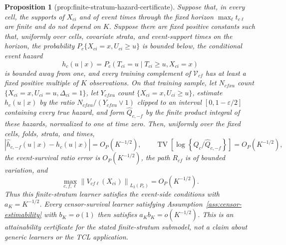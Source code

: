 \documentclass{article}
\newtheorem{proposition}{Proposition}
\begin{document}
\begin{proposition}[prop:finite-stratum-hazard-certificate]\label{prop:finite-stratum-hazard-certificate}
Suppose that, in every cell, the supports of \(X_{ci}\) and of event times through the fixed horizon \(\max_\ell t_{c\ell}\) are finite and do not depend on \(K\). Suppose there are fixed positive constants such that, uniformly over cells, covariate strata, and event-support times on the horizon, the probability \(P_c\{X_{ci}=x,U_{ci}\ge u\}\) is bounded below, the conditional event hazard
\[
 h_c(u\mid x)=P_c(T_{ci}=u\mid T_{ci}\ge u,X_{ci}=x)
\]
is bounded away from one, and every training complement of \(\mathcal V_{cf}\) has at least a fixed positive multiple of \(K\) observations. On that training sample, let \(N_{cfxu}\) count \(\{X_{ci}=x,U_{ci}=u,\Delta_{ci}=1\}\), let \(Y_{cfxu}\) count \(\{X_{ci}=x,U_{ci}\ge u\}\), estimate \(h_c(u\mid x)\) by the ratio \(N_{cfxu}/(Y_{cfxu}\vee1)\) clipped to an interval \([0,1-\varepsilon/2]\) containing every true hazard, and form \(\widehat Q_{c,-f}\) by the finite product integral of these hazards, normalized to one at time zero. Then, uniformly over the fixed cells, folds, strata, and times,
\[
 \left|\widehat h_{c,-f}(u\mid x)-h_c(u\mid x)\right|=O_P(K^{-1/2}),
 \qquad
 \operatorname{TV}\!\left[\log\!\left\{Q_c/\widehat Q_{c,-f}\right\}\right]=O_P(K^{-1/2}),
\]
the event-survival ratio error is \(O_P(K^{-1/2})\), the path \(R_{cf}\) is of bounded variation, and
\[
 \max_{c,f,\ell}\left\|V_{cf\ell}(X_{ci})\right\|_{L_2(P_c)}=O_P(K^{-1/2}).
\]
Thus this finite-stratum learner satisfies the event-side conditions with \(a_K=K^{-1/2}\). Every censor-survival learner satisfying Assumption~\ref{ass:censor-estimability} with \(b_K=o(1)\) then satisfies \(a_Kb_K=o(K^{-1/2})\). This is an attainability certificate for the stated finite-stratum submodel, not a claim about generic learners or the TCL application.
\end{proposition}
\end{document}
